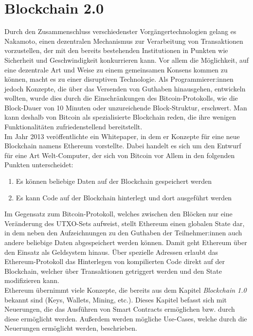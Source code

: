\chapter{Blockchain 2.0}
Durch den Zusammenschluss verschiedenster Vorgängertechnologien gelang es Nakamoto, einen dezentralen Mechanismus zur Verarbeitung von Transaktionen vorzustellen, der mit den bereits bestehenden Institutionen in Punkten wie Sicherheit und Geschwindigkeit konkurrieren kann. Vor allem die Möglichkeit, auf eine dezentrale Art und Weise zu einem gemeinsamen Konsens kommen zu können, macht es zu einer disruptiven Technologie. Als Programmierer:innen jedoch Konzepte, die über das Versenden von Guthaben hinausgehen, entwickeln wollten, wurde dies durch die Einschränkungen des Bitcoin-Protokolls, wie die Block-Dauer von 10 Minuten oder unzureichende Block-Struktur, erschwert. Man kann deshalb von Bitcoin als spezialisierte Blockchain reden, die ihre wenigen Funktionalitäten zufriedenstellend bereitstellt.\\

Im Jahr 2013 veröffentlichte \cite{buterin_whitepaper_2013} ein Whitepaper, in dem er Konzepte für eine neue Blockchain namens Ethereum vorstellte. Dabei handelt es sich um den Entwurf für eine Art Welt-Computer, der sich von Bitcoin vor Allem in den folgenden Punkten unterscheidet:
\begin{enumerate}
	\item Es können beliebige Daten auf der Blockchain gespeichert werden
	\item Es kann Code auf der Blockchain hinterlegt und dort ausgeführt werden
	\end{enumerate}
Im Gegensatz zum Bitcoin-Protokoll, welches zwischen den Blöcken nur eine Veränderung des UTXO-Sets aufweist, stellt Ethereum einen globalen State dar, in dem neben den Aufzeichnungen zu den Guthaben der Teilnehmer:innen auch andere beliebige Daten abgespeichert werden können. Damit geht Ethereum über den Einsatz als Geldsystem hinaus.
Über spezielle Adressen erlaubt das Ethereum-Protokoll das Hinterlegen von kompilierten Code direkt auf der Blockchain, welcher über Transaktionen getriggert werden und den State modifizieren kann. 
\\

Ethereum übernimmt viele Konzepte, die bereits aus dem Kapitel \emph{Blockchain 1.0} bekannt sind (Keys, Wallets, Mining, etc.). Dieses Kapitel befasst sich mit Neuerungen, die das Ausführen von Smart Contracts ermöglichen bzw. durch diese ermöglicht werden. Außerdem werden mögliche Use-Cases, welche durch die Neuerungen ermöglicht werden, beschrieben.
